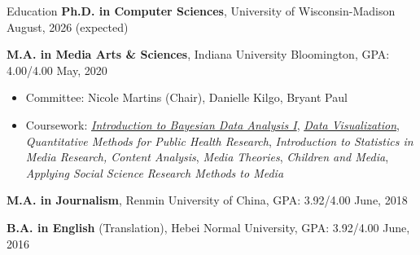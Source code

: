 \documentclass{resume}
\newcommand{\smallspace}{\hspace{0.2em}}
\begin{document}
\fancyheadoffset[RO]{5em}
\fancyfootoffset[RO]{0cm}
\thispagestyle{firstpage}

\begin{rSection}{Education}
{\textbf {Ph.D. in Computer Sciences}}, University of Wisconsin-Madison \hfill {August, 2026 (expected)} 

{\textbf {M.A. in Media Arts \& Sciences}}, Indiana University Bloomington, GPA: 4.00/4.00 \hfill {May, 2020} 
\begin{itemize}
  \item[] \vspace{-0.5em} \hspace{-1em} Committee: Nicole Martins (Chair), Danielle Kilgo, Bryant Paul
  \item[] \vspace{-0.5em} \hspace{-1.0em} Coursework: \href{https://jkkweb.sitehost.iu.edu/jkkteach/P533/}{\emph{Introduction to Bayesian Data Analysis I}}, \smallspace \href{http://yyahn.com/dviz-course/}{\emph{Data Visualization}}, \smallspace \emph{Quantitative Methods for Public Health Research}, \smallspace \emph{Introduction to Statistics in Media Research, Content Analysis}, \smallspace \emph{Media Theories}, \smallspace \emph{Children and Media}, \smallspace \emph{Applying Social Science Research Methods to Media}
\end{itemize}

{\bf M.A. in Journalism}, Renmin University of China, GPA: 3.92/4.00 \hfill {June, 2018} 

{\bf B.A. in English} (Translation), Hebei Normal University, GPA: 3.92/4.00 \hfill {June, 2016} 
\end{rSection}
\end{document}
